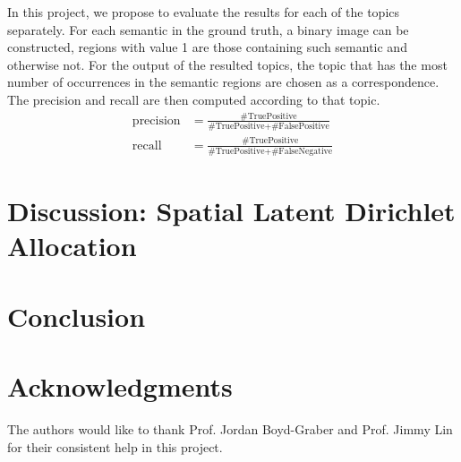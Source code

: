 \documentclass{sig-alternate}
\begin{document}
In this project, we propose to evaluate the results for each of the topics separately. For each semantic in the ground truth, a binary image can be constructed, regions with value 1 are those containing such semantic and otherwise not. For the output of the resulted topics, the topic that has the most number of occurrences in the semantic regions are chosen as a correspondence. The precision and recall are then computed according to that topic.
\begin{align}
\text{precision}&=\frac{\text{\#TruePositive}}{\text{\#TruePositive+\#FalsePositive}}\\
\text{recall}&=\frac{\text{\#TruePositive}}{\text{\#TruePositive+\#FalseNegative}}
\end{align}
\section{Discussion: Spatial Latent Dirichlet Allocation}\label{sec:slda}

\section{Conclusion}\label{sec:con}




\section{Acknowledgments}
The authors would like to thank Prof. Jordan Boyd-Graber and Prof. Jimmy Lin for their consistent help in this project.

%

%
%
\appendix
\end{document}
